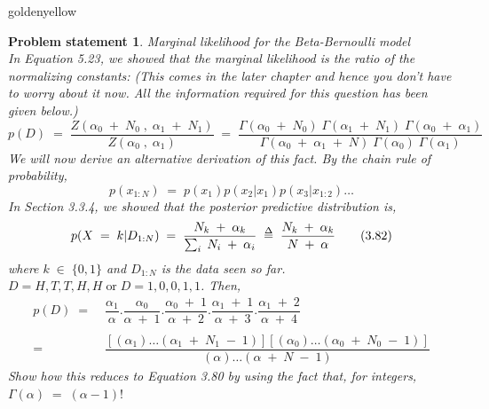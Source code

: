 \documentclass[12pt]{article}
\newtheorem*{prob*}{Problem statement}
\def\delequal{\mathrel{\ensurestackMath{\stackon[1pt]{=}{\scriptstyle\Delta}}}}
\begin{document}
	
	\begin{mybox}{goldenyellow}{}
		\begin{prob*}		
			Marginal likelihood for the Beta-Bernoulli model\\
			In Equation 5.23, we showed that the marginal likelihood is the ratio of the normalizing constants: (This comes in the later chapter and hence you don't have to worry about it now. All the information required for this question has been given below.)\\
			\begin{equation}
			p(\textit{D})\;=\;\dfrac{\textit{Z}({\alpha}_0\;+\;N_0\;,\;{\alpha}_1\;+\;N_1)}{\textit{Z}(\alpha_0\;,\;\alpha_1)} \;=\;\dfrac{\Gamma(\alpha_0\;+\;N_0)\;\Gamma(\alpha_1\;+\;N_1)\;\Gamma(\alpha_0\;+\;\alpha_1)}{\Gamma(\alpha_0\;+\;\alpha_1\;+\;N)\;\Gamma(\alpha_0)\;\Gamma(\alpha_1)} \tag{3.80}
			\end{equation}
			We will now derive an alternative derivation of this fact. By the chain rule of probability,\\
			\begin{equation}
			p(x_{1:N})\;=\;p(x_1)p(x_2|x_1)p(x_3|x_{1:2})\dots \tag{3.81}
			\end{equation}
			In Section 3.3.4, we showed that the posterior predictive distribution is,\\
			\begin{equation}
			p(X\;=\;k|D_{1:N})\;=\;\dfrac{N_k\;+\;\alpha_k}{\sum_i\;N_i\;+\;\alpha_i}\;\delequal\;\dfrac{N_k\;+\;\alpha_k}{N\;+\;\alpha} \tag{3.82}
			\end{equation}
			where $k\;\in\;\{0,1\}$ and $D_{1:N}$ is the data seen so far. $D = H, T, T,H,H \;\text{or}\; D = 1, 0, 0, 1, 1$.
			Then,\\
			\begin{align}
			p(D)\;=&\;\dfrac{\alpha_1}{\alpha}.\dfrac{\alpha_0}{\alpha\;+\;1}.\dfrac{\alpha_0\;+\;1}{\alpha\;+\;2}.\dfrac{\alpha_1\;+\;1}{\alpha\;+\;3}.\dfrac{\alpha_1\;+\;2}{\alpha\;+\;4} \tag{3.83}\\\nonumber\\
			=&\;\dfrac{[(\alpha_1)\dots(\alpha_1\;+\;N_1\;-\;1)][(\alpha_0)\dots(\alpha_0\;+\;N_0\;-\;1)]}{(\alpha)\dots(\alpha\;+\;N\;-\;1)} \tag{3.85} \label{eqn3.85}
			\end{align}
			Show how this reduces to Equation 3.80 by using the fact that, for integers, $\Gamma(\alpha)\;=\;(\alpha-1)!$
			
			\end{prob*}
	\end{mybox}
\end{document}
